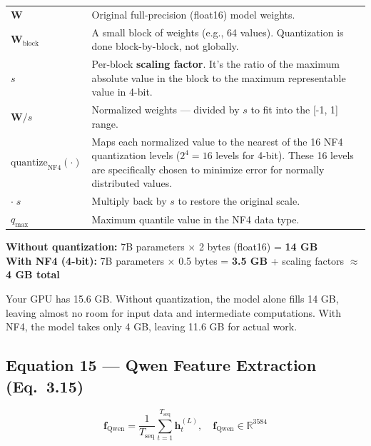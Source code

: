 \documentclass[12pt, a4paper]{article}
\begin{document}
\begin{explainbox}
\begin{tabular}{lp{11cm}}
$\mathbf{W}$ & Original full-precision (float16) model weights.\\[0.2cm]
$\mathbf{W}_{\text{block}}$ & A small block of weights (e.g., 64 values). Quantization is done block-by-block, not globally.\\[0.2cm]
$s$ & Per-block \textbf{scaling factor}. It's the ratio of the maximum absolute value in the block to the maximum representable value in 4-bit.\\[0.2cm]
$\mathbf{W}/s$ & Normalized weights --- divided by $s$ to fit into the [-1, 1] range.\\[0.2cm]
$\text{quantize}_{\text{NF4}}(\cdot)$ & Maps each normalized value to the nearest of the 16 NF4 quantization levels ($2^4 = 16$ levels for 4-bit). These 16 levels are specifically chosen to minimize error for normally distributed values.\\[0.2cm]
$\cdot\; s$ & Multiply back by $s$ to restore the original scale.\\[0.2cm]
$q_{\max}$ & Maximum quantile value in the NF4 data type.
\end{tabular}
\end{explainbox}

\begin{examplebox}
\textbf{Without quantization:} 7B parameters $\times$ 2 bytes (float16) = \textbf{14 GB}\\
\textbf{With NF4 (4-bit):} 7B parameters $\times$ 0.5 bytes = \textbf{3.5 GB} + scaling factors $\approx$ \textbf{4 GB total}

Your GPU has 15.6 GB. Without quantization, the model alone fills 14 GB, leaving almost no room for input data and intermediate computations. With NF4, the model takes only 4 GB, leaving 11.6 GB for actual work.
\end{examplebox}


\subsection{Equation 15 --- Qwen Feature Extraction (Eq.~3.15)}

\begin{eqbox}
\[
\mathbf{f}_{\text{Qwen}} = \frac{1}{T_{\text{seq}}} \sum_{t=1}^{T_{\text{seq}}} \mathbf{h}_t^{(L)}, \quad \mathbf{f}_{\text{Qwen}} \in \mathbb{R}^{3584}
\]
\end{eqbox}
\end{document}

